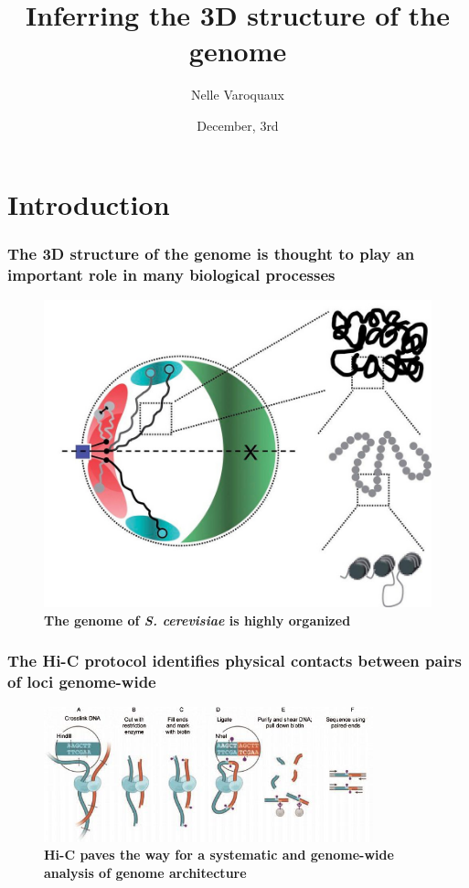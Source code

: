 \documentclass[xcolor=dvipsnames]{beamer}
\title{\textbf{Inferring the 3D structure of the genome}}
\author[Varoquaux Nelle]{
Nelle Varoquaux}
\date{December, 3rd}
\institute{Mines ParisTech, Institut Curie, INSERM}
\begin{document}
\begin{frame}[t, noframenumbering]
  \maketitle

\end{frame}

\setcounter{framenumber}{0}

\section{Introduction}
\begin{frame}
\frametitle{The 3D structure of the genome is thought to play an important
role in many biological processes}
\vspace{-0.6em}
\begin{figure}
\begin{center}
\includegraphics[width=0.7\linewidth]{figures/yeasts_genome_architecture.jpg}
\end{center}
\caption{\textbf{The genome of \textit{S. cerevisiae} is highly organized}
         \citep{zimmer:principles}}
\end{figure}
\end{frame}

\begin{frame}
\frametitle{The Hi-C protocol identifies physical contacts between
pairs of loci genome-wide}
\begin{figure}
\centering
\includegraphics[width=0.85\textwidth]{figures/hic_protocol.jpg}
\caption{\textbf{Hi-C paves the way for a systematic and genome-wide analysis
of genome architecture} \citep{rao:3d}}
\end{figure}
\end{frame}
\end{document}
